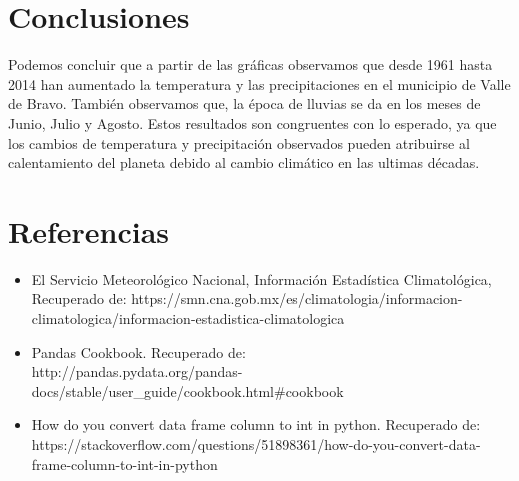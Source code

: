 \documentclass[12pt]{article}
\begin{document}
\section{Conclusiones}
Podemos concluir que a partir de las gráficas observamos que desde 1961 hasta 2014 han aumentado la temperatura y las precipitaciones en el municipio de Valle de Bravo. También observamos que, la época de lluvias se da en los meses de Junio, Julio y Agosto. Estos resultados son congruentes con lo esperado, ya que los cambios de temperatura y precipitación observados pueden atribuirse al calentamiento del planeta debido al cambio climático en las ultimas décadas.

\section{Referencias}
\begin{itemize}
\item El Servicio Meteorológico Nacional, Información Estadística Climatológica,\\ Recuperado de: https://smn.cna.gob.mx/es/climatologia/informacion-climatologica/informacion-estadistica-climatologica
\item Pandas Cookbook. Recuperado de:\\ http://pandas.pydata.org/pandas-docs/stable/user\_guide/cookbook.html\#cookbook
\item How do you convert data frame column to int in python. Recuperado de:\\
https://stackoverflow.com/questions/51898361/how-do-you-convert-data-frame-column-to-int-in-python
\end{itemize}
\end{document}

